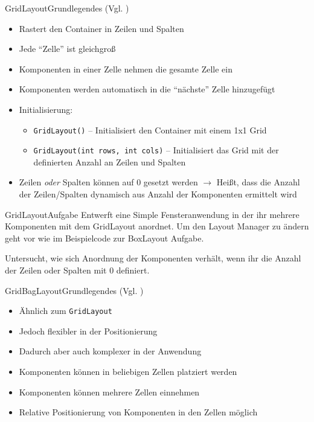 \begin{frame}{GridLayout}{Grundlegendes (Vgl. \cite{orac:gridlayout})}
    \begin{itemize}
        \item Rastert den Container in Zeilen und Spalten
        \item Jede "`Zelle"' ist gleichgroß
        \item Komponenten in einer Zelle nehmen die gesamte Zelle ein
        \item Komponenten werden automatisch in die "`nächste"' Zelle hinzugefügt
        \item Initialisierung:
        \begin{itemize}
            \item \texttt{GridLayout()} -- Initialisiert den Container mit einem 1x1 Grid
            \item \texttt{GridLayout(int rows, int cols)} -- Initialisiert das Grid mit der definierten Anzahl an Zeilen und Spalten
        \end{itemize}
        \item Zeilen \textit{oder} Spalten können auf $0$ gesetzt werden $\rightarrow$ Heißt, dass die Anzahl der Zeilen/Spalten dynamisch aus Anzahl der Komponenten ermittelt wird
    \end{itemize}
\end{frame}

\begin{frame}{GridLayout}{Aufgabe}
Entwerft eine Simple Fensteranwendung in der ihr mehrere Komponenten mit dem GridLayout anordnet. Um den Layout Manager zu ändern geht vor wie im Beispielcode zur BoxLayout Aufgabe.

Untersucht, wie sich Anordnung der Komponenten verhält, wenn ihr die Anzahl der Zeilen oder Spalten mit $0$ definiert.
\end{frame}

\begin{frame}{GridBagLayout}{Grundlegendes (Vgl. \cite{orac:gridbaglayout})}
    \begin{itemize}
        \item Ähnlich zum \texttt{GridLayout}
        \item Jedoch flexibler in der Positionierung
        \item Dadurch aber auch komplexer in der Anwendung
        \item Komponenten können in beliebigen Zellen platziert werden
        \item Komponenten können mehrere Zellen einnehmen
        \item Relative Positionierung von Komponenten in den Zellen möglich
    \end{itemize}
\end{frame}

